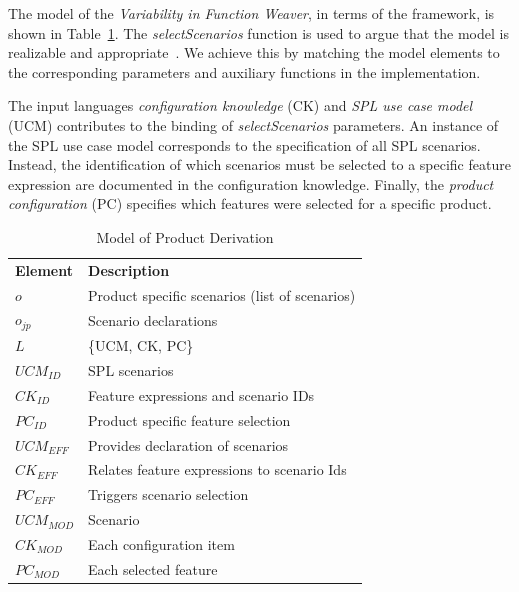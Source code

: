 \documentclass{sig-alt-full}
\begin{document}
The model of the \emph{Variability in Function Weaver}, in terms of the
framework, is shown in Table~\ref{tab:vf-weaver}. The \emph{selectScenarios}
function is used to argue that the model is realizable and
appropriate~\cite{Masuhara:2003aa}.
We achieve this by matching the model elements to
the corresponding parameters and auxiliary functions in the implementation.

The input languages
\emph{configuration knowledge} (CK) and \emph{SPL use case model} (UCM) contributes to the
binding of \emph{selectScenarios} parameters. An instance of the SPL use
case model corresponds to the specification of all SPL scenarios.
Instead, the identification of which scenarios must be selected to a specific
feature expression are documented in the configuration knowledge. Finally, the
\emph{product configuration} (PC) specifies which features were selected for a
specific product.

\begin{table}[htb]
\begin{center}
\caption{Model of Product Derivation} \label{tab:vf-weaver}
\begin{tabular}{p{0.6in}p{2.4in}}
   \hline\noalign{\smallskip}
  {\bf Element} & {\bf Description} \\
   \noalign{\smallskip}
   \hline
   \noalign{\smallskip}
   $o$              & Product specific scenarios (list of scenarios) \\
   $o_{jp}$        	& Scenario declarations \\
   $L$              & \{UCM, CK, PC\} \\
   $UCM_{ID}$ 		& SPL scenarios \\
   $CK_{ID}$    	& Feature expressions and scenario IDs\\
   $PC_{ID}$    	& Product specific feature selection \\
   $UCM_{EFF}$ 		& Provides declaration of scenarios \\
   $CK_{EFF}$    	& Relates feature expressions to scenario Ids  \\
   $PC_{EFF}$    	& Triggers scenario selection \\
   $UCM_{MOD}$ 		& Scenario \\
   $CK_{MOD}$    	& Each configuration item  \\
   $PC_{MOD}$    	& Each selected feature \\
  \hline
  \end{tabular}
\end{center}
\end{table}
\end{document}
